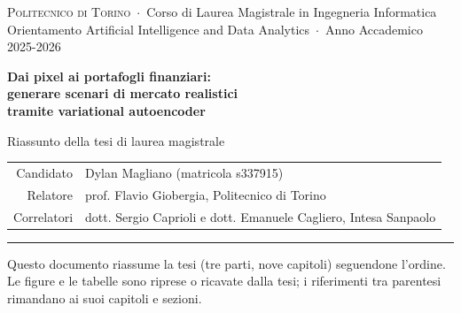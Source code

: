 \documentclass[11pt,a4paper]{article}
\begin{document}
\begin{center}
  {\small\color{grigio}\textsc{Politecnico di Torino} \,$\cdot$\, Corso di Laurea Magistrale in Ingegneria Informatica\\
  Orientamento Artificial Intelligence and Data Analytics \,$\cdot$\, Anno Accademico 2025-2026}\\[1.4ex]
  {\LARGE\bfseries\color{polito}Dai pixel ai portafogli finanziari:\\[0.3ex] generare scenari di mercato realistici\\[0.3ex] tramite variational autoencoder\par}
  \vspace{1.2ex}
  {\large Riassunto della tesi di laurea magistrale\par}
  \vspace{1.4ex}
  \begin{tabular}{@{}r@{\hspace{0.8em}}l@{}}
    \textcolor{grigio}{Candidato} & Dylan Magliano (matricola s337915)\\
    \textcolor{grigio}{Relatore} & prof. Flavio Giobergia, Politecnico di Torino\\
    \textcolor{grigio}{Correlatori} & dott. Sergio Caprioli e dott. Emanuele Cagliero, Intesa Sanpaolo\\
  \end{tabular}
  \vspace{0.8ex}
  {\color{polito!60}\rule{0.6\linewidth}{0.4pt}}
\end{center}

{\small\color{grigio}Questo documento riassume la tesi (tre parti, nove capitoli) seguendone l'ordine. Le figure e le tabelle sono riprese o ricavate dalla tesi; i riferimenti tra parentesi rimandano ai suoi capitoli e sezioni.\par}







\end{document}
